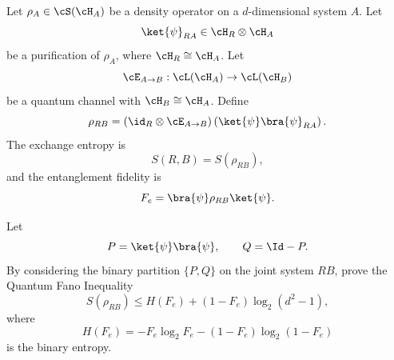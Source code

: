 Let $\rho_A\in \cS(\cH_A)$ be a density operator on a $d$-dimensional system $A$. Let
$$
\ket{\psi}_{RA}\in \cH_R\otimes \cH_A
$$
be a purification of $\rho_A$, where $\cH_R\cong \cH_A$. Let
$$
\cE_{A\to B}:\cL(\cH_A)\to \cL(\cH_B)
$$
be a quantum channel with $\cH_B\cong \cH_A$. Define
$$
\rho_{RB}
=
(\id_R\otimes \cE_{A\to B})
\left(
\ket{\psi}\bra{\psi}_{RA}
\right).
$$
The exchange entropy is
$$
S(R,B)=S(\rho_{RB}),
$$
and the entanglement fidelity is
$$
F_e
=
\bra{\psi}\rho_{RB}\ket{\psi}.
$$

Let
$$
P=\ket{\psi}\bra{\psi},
\qquad
Q=\Id-P.
$$
By considering the binary partition $\{P,Q\}$ on the joint system $RB$, prove the Quantum Fano Inequality
$$
S(\rho_{RB})
\leq
H(F_e)
+
(1-F_e)\log_2(d^2-1),
$$
where
$$
H(F_e)
=
-F_e\log_2 F_e
-
(1-F_e)\log_2(1-F_e)
$$
is the binary entropy.
